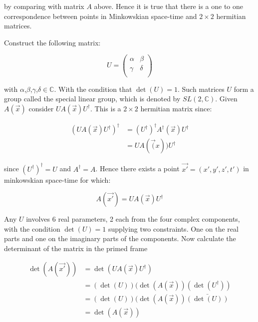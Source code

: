 \noindent by comparing with matrix $A$ above. Hence it is true that there is a one to one correspondence between points in Minkowskian space-time and $2 \times 2$ hermitian matrices.

Construct the following matrix:

\begin{equation*} 
U = \left( 
\begin{array}{cc}
\alpha & \beta \\
\gamma & \delta \\
\end{array}
\right)
\end{equation*}

\noindent with $\alpha$,$\beta$,$\gamma$,$\delta \in \mathbb{C}$. With the condition that $\det(U) = 1$. Such matrices $U$ form a group called the special linear group, which is denoted by $SL(2, \mathbb{C})$. Given $A(\vec{x})$ consider $U A(\vec{x}) U^{\dagger}$. This is a $2 \times 2$ hermitian matrix since:

\begin{eqnarray*}
(U A(\vec{x}) U^{\dagger})^{\dagger} & =  (U^{\dagger})^{\dagger} A^{\dagger}(\vec{x}) U^{\dagger} \\
                                     & = U A(\vec(x)) U^{\dagger}
\end{eqnarray*} 

\noindent since $(U^{\dagger})^{\dagger} = U$ and $A^{\dagger} = A$. Hence there exists a point $\vec{x'} = (x', y', z', t')$ in minkowskian space-time for which:

\begin{equation}\label{SL_trans}
A(\vec{x'}) = U A(\vec{x}) U^{\dagger}
\end{equation}

Any $U$ involves 6 real parameters, 2 each from the four complex components, with the condition $\det(U) = 1$ supplying two constraints. One on the real parts and one on the imaginary parts of the components. Now calculate the determinant of the matrix in the primed frame

\begin{eqnarray*}  
\det(A(\vec{x'})) & = \det(U A(\vec{x}) U^{\dagger}) \\
                  & = (\det(U))(\det(A(\vec{x}))(\det(U^{\dagger})) \\
                  & = (\det(U))(\det(A(\vec{x}))\bar{(\det(U))} \\
                  & = \det(A(\vec{x}))
\end{eqnarray*}

